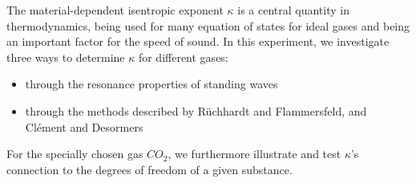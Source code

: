 \documentclass[../main.tex]{subfiles}
\begin{document}
The material-dependent isentropic exponent $\kappa$ is a central quantity in thermodynamics, being used for many equation of states for ideal gases and being an important factor for the speed of sound. In this experiment, we investigate three ways to determine $\kappa$ for different gases:
\begin{itemize}
    \item through the resonance properties of standing waves 
    \item through the methods described by Rüchhardt and Flammersfeld, and Clément and Desormers
\end{itemize}

\noindent For the specially chosen gas $CO_2$, we furthermore illustrate and test $\kappa$'s connection to the degrees of freedom of a given substance.
\end{document}
